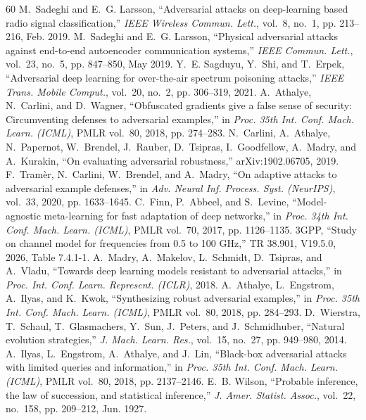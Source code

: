 \documentclass[journal]{IEEEtran}
\theoremstyle{remark}
\begin{document}
\begin{thebibliography}{60}
 M.~Sadeghi and E.~G. Larsson, ``Adversarial attacks on deep-learning based radio signal classification,'' \emph{IEEE Wireless Commun. Lett.}, vol.~8, no.~1, pp. 213--216, Feb. 2019.
 M.~Sadeghi and E.~G. Larsson, ``Physical adversarial attacks against end-to-end autoencoder communication systems,'' \emph{IEEE Commun. Lett.}, vol.~23, no.~5, pp. 847--850, May 2019.
 Y.~E. Sagduyu, Y.~Shi, and T.~Erpek, ``Adversarial deep learning for over-the-air spectrum poisoning attacks,'' \emph{IEEE Trans. Mobile Comput.}, vol.~20, no.~2, pp. 306--319, 2021.
 A.~Athalye, N.~Carlini, and D.~Wagner, ``Obfuscated gradients give a false sense of security: Circumventing defenses to adversarial examples,'' in \emph{Proc. 35th Int. Conf. Mach. Learn. (ICML)}, PMLR vol.~80, 2018, pp. 274--283.
 N.~Carlini, A.~Athalye, N.~Papernot, W.~Brendel, J.~Rauber, D.~Tsipras, I.~Goodfellow, A.~Madry, and A.~Kurakin, ``On evaluating adversarial robustness,'' arXiv:1902.06705, 2019.
 F.~Tram{\`e}r, N.~Carlini, W.~Brendel, and A.~Madry, ``On adaptive attacks to adversarial example defenses,'' in \emph{Adv. Neural Inf. Process. Syst. (NeurIPS)}, vol.~33, 2020, pp. 1633--1645.
 C.~Finn, P.~Abbeel, and S.~Levine, ``Model-agnostic meta-learning for fast adaptation of deep networks,'' in \emph{Proc. 34th Int. Conf. Mach. Learn. (ICML)}, PMLR vol.~70, 2017, pp. 1126--1135.
 3GPP, ``Study on channel model for frequencies from 0.5 to 100 GHz,'' TR 38.901, V19.5.0, 2026, Table 7.4.1-1.
 A.~Madry, A.~Makelov, L.~Schmidt, D.~Tsipras, and A.~Vladu, ``Towards deep learning models resistant to adversarial attacks,'' in \emph{Proc. Int. Conf. Learn. Represent. (ICLR)}, 2018.
 A.~Athalye, L.~Engstrom, A.~Ilyas, and K.~Kwok, ``Synthesizing robust adversarial examples,'' in \emph{Proc. 35th Int. Conf. Mach. Learn. (ICML)}, PMLR vol.~80, 2018, pp. 284--293.
 D.~Wierstra, T.~Schaul, T.~Glasmachers, Y.~Sun, J.~Peters, and J.~Schmidhuber, ``Natural evolution strategies,'' \emph{J. Mach. Learn. Res.}, vol.~15, no.~27, pp. 949--980, 2014.
 A.~Ilyas, L.~Engstrom, A.~Athalye, and J.~Lin, ``Black-box adversarial attacks with limited queries and information,'' in \emph{Proc. 35th Int. Conf. Mach. Learn. (ICML)}, PMLR vol.~80, 2018, pp. 2137--2146.
 E.~B. Wilson, ``Probable inference, the law of succession, and statistical inference,'' \emph{J. Amer. Statist. Assoc.}, vol.~22, no.~158, pp. 209--212, Jun. 1927.

\end{thebibliography}
\end{document}
